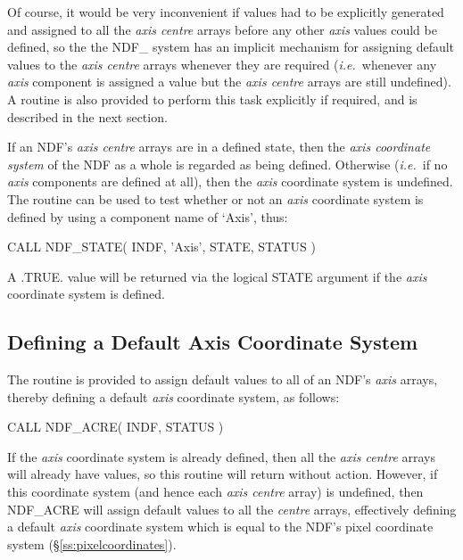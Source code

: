 \documentclass[twoside,11pt,nolof]{starlink}
\providecommand{\st}[1]{{\emph{#1}}}
\begin{document}
Of course, it would be very inconvenient if values had to be explicitly
generated and assigned to all the \st{axis centre\/} arrays before any
other \st{axis\/} values could be defined, so the the NDF\_ system has an
implicit mechanism for assigning default values to the \st{axis centre\/}
arrays whenever they are required (\st{i.e.}\ whenever any \st{axis\/}
component is assigned a value but the \st{axis centre\/} arrays are still
undefined).
A routine is also provided to perform this task explicitly if required, and
is described in the next section.

If an NDF's \st{axis centre\/} arrays are in a defined state, then the
\st{axis coordinate system\/} of the NDF as a whole is regarded as
being
defined.
Otherwise (\st{i.e.}\ if no \st{axis\/} components are defined at all),
then the \st{axis\/} coordinate system is undefined.
The routine  can be used to test whether or not an \st{axis\/}
coordinate system is defined by using a component name of `Axis', thus:

\small
\begin{terminalv}
      CALL NDF_STATE( INDF, 'Axis', STATE, STATUS )
\end{terminalv}
\normalsize

A .TRUE. value will be returned via the logical STATE argument if the
\st{axis\/} coordinate system is defined.

\subsection{\label{ss:acre}Defining a Default Axis Coordinate System}

The routine  is provided to assign default values to all of an
NDF's \st{axis\/} arrays, thereby defining a default \st{axis\/}
coordinate system, as follows:

\small
\begin{terminalv}
      CALL NDF_ACRE( INDF, STATUS )
\end{terminalv}
\normalsize

If the \st{axis\/} coordinate system is already defined, then all the
\st{axis centre\/} arrays will already have values, so this routine
will return
without action.
However, if this coordinate system (and hence each \st{axis centre\/}
array) is undefined, then NDF\_ACRE will assign default values to all the
\st{centre\/} arrays, effectively defining a default \st{axis\/}
coordinate system which is equal to the NDF's pixel coordinate system
(\S\ref{ss:pixelcoordinates}).
\end{document}

